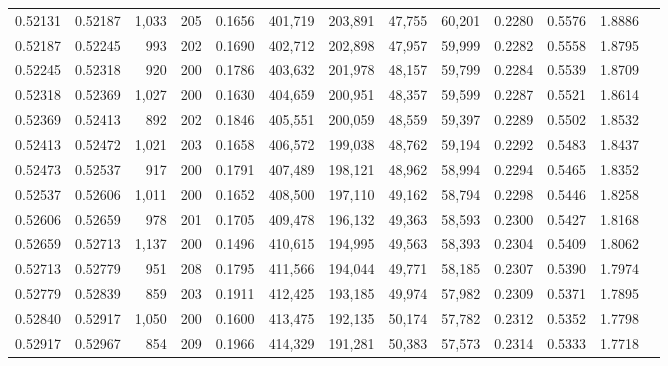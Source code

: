 \begin{tabular}{rrrrrrrrrrrrr}
0.52131 & 0.52187 & 1,033 & 205 &                                     0.1656 & 401,719 & 203,891 &  47,755 &  60,201 & 0.2280 & 0.5576 & 1.8886 \\
0.52187 & 0.52245 &   993 & 202 &                                     0.1690 & 402,712 & 202,898 &  47,957 &  59,999 & 0.2282 & 0.5558 & 1.8795 \\
0.52245 & 0.52318 &   920 & 200 &                                     0.1786 & 403,632 & 201,978 &  48,157 &  59,799 & 0.2284 & 0.5539 & 1.8709 \\
0.52318 & 0.52369 & 1,027 & 200 &                                     0.1630 & 404,659 & 200,951 &  48,357 &  59,599 & 0.2287 & 0.5521 & 1.8614 \\
0.52369 & 0.52413 &   892 & 202 &                                     0.1846 & 405,551 & 200,059 &  48,559 &  59,397 & 0.2289 & 0.5502 & 1.8532 \\
0.52413 & 0.52472 & 1,021 & 203 &                                     0.1658 & 406,572 & 199,038 &  48,762 &  59,194 & 0.2292 & 0.5483 & 1.8437 \\
0.52473 & 0.52537 &   917 & 200 &                                     0.1791 & 407,489 & 198,121 &  48,962 &  58,994 & 0.2294 & 0.5465 & 1.8352 \\
0.52537 & 0.52606 & 1,011 & 200 &                                     0.1652 & 408,500 & 197,110 &  49,162 &  58,794 & 0.2298 & 0.5446 & 1.8258 \\
0.52606 & 0.52659 &   978 & 201 &                                     0.1705 & 409,478 & 196,132 &  49,363 &  58,593 & 0.2300 & 0.5427 & 1.8168 \\
0.52659 & 0.52713 & 1,137 & 200 &                                     0.1496 & 410,615 & 194,995 &  49,563 &  58,393 & 0.2304 & 0.5409 & 1.8062 \\
0.52713 & 0.52779 &   951 & 208 &                                     0.1795 & 411,566 & 194,044 &  49,771 &  58,185 & 0.2307 & 0.5390 & 1.7974 \\
0.52779 & 0.52839 &   859 & 203 &                                     0.1911 & 412,425 & 193,185 &  49,974 &  57,982 & 0.2309 & 0.5371 & 1.7895 \\
0.52840 & 0.52917 & 1,050 & 200 &                                     0.1600 & 413,475 & 192,135 &  50,174 &  57,782 & 0.2312 & 0.5352 & 1.7798 \\
0.52917 & 0.52967 &   854 & 209 &                                     0.1966 & 414,329 & 191,281 &  50,383 &  57,573 & 0.2314 & 0.5333 & 1.7718 \\

\end{tabular}
